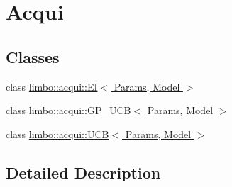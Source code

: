 \hypertarget{group__acqui}{}\section{Acqui}
\label{group__acqui}
\subsection*{Classes}
\begin{DoxyCompactItemize}
\item 
class \hyperlink{classlimbo_1_1acqui_1_1_e_i}{limbo\+::acqui\+::\+E\+I$<$ Params, Model $>$}
\item 
class \hyperlink{classlimbo_1_1acqui_1_1_g_p___u_c_b}{limbo\+::acqui\+::\+G\+P\+\_\+\+U\+C\+B$<$ Params, Model $>$}
\item 
class \hyperlink{classlimbo_1_1acqui_1_1_u_c_b}{limbo\+::acqui\+::\+U\+C\+B$<$ Params, Model $>$}
\end{DoxyCompactItemize}


\subsection{Detailed Description}
